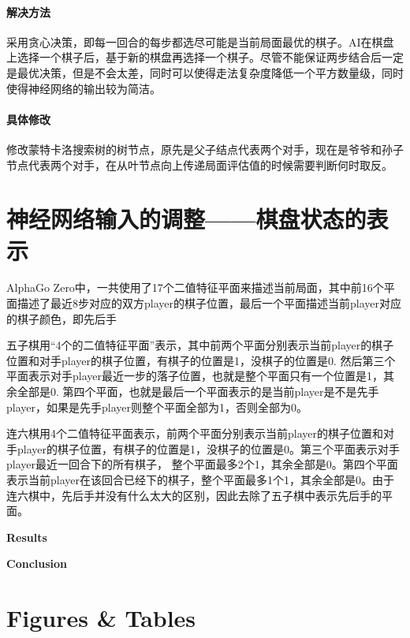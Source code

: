 \documentclass[portrait]{a0poster}	%
\begin{document}
\begin{multicols}{2}
\paragraph{解决方法}采用贪心决策，即每一回合的每步都选尽可能是当前局面最优的棋子。AI在棋盘上选择一个棋子后，基于新的棋盘再选择一个棋子。尽管不能保证两步结合后一定是最优决策，但是不会太差，同时可以使得走法复杂度降低一个平方数量级，同时使得神经网络的输出较为简洁。
\paragraph{具体修改}修改蒙特卡洛搜索树的树节点，原先是父子结点代表两个对手，现在是爷爷和孙子节点代表两个对手，在从叶节点向上传递局面评估值的时候需要判断何时取反。
\section{神经网络输入的调整——棋盘状态的表示}
AlphaGo Zero中，一共使用了17个二值特征平面来描述当前局面，其中前16个平面描述了最近8步对应的双方player的棋子位置，最后一个平面描述当前player对应的棋子颜色，即先后手

五子棋用“4个的二值特征平面”表示，其中前两个平面分别表示当前player的棋子位置和对手player的棋子位置，有棋子的位置是1，没棋子的位置是0. 然后第三个平面表示对手player最近一步的落子位置，也就是整个平面只有一个位置是1，其余全部是0. 第四个平面，也就是最后一个平面表示的是当前player是不是先手player，如果是先手player则整个平面全部为1，否则全部为0。

连六棋用4个二值特征平面表示，前两个平面分别表示当前player的棋子位置和对手player的棋子位置，有棋子的位置是1，没棋子的位置是0。第三个平面表示对手player最近一回合下的所有棋子， 整个平面最多2个1，其余全部是0。第四个平面表示当前player在该回合已经下的棋子，整个平面最多1个1，其余全部是0。由于连六棋中，先后手并没有什么太大的区别，因此去除了五子棋中表示先后手的平面。

\noindent\textbf{Results} 
\lipsum[1] 

\noindent\textbf{Conclusion} 
\lipsum[1]

\section*{Figures \& Tables}




\end{multicols}
\end{document}
